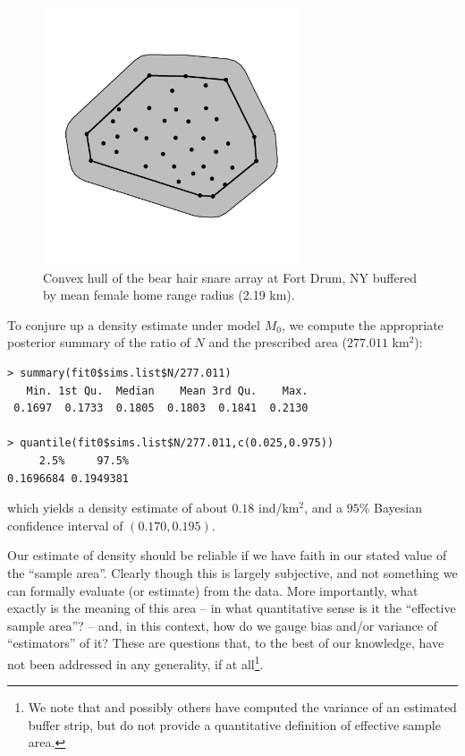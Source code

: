 \begin{figure}[ht]
\begin{center}
\includegraphics[height=3in,width=3in]{Ch3-Closed/figs/bufferedCH}
\end{center}
\caption{Convex hull of the bear hair snare array at Fort Drum, NY buffered by mean female
home range radius (2.19 km).}
\label{closed.fig.bch}
\end{figure}

To conjure up a
density estimate under model $M_0$, we compute the appropriate
posterior summary of the ratio of $N$ and the prescribed area ($277.011$ km$^2$):
{\small
\begin{verbatim}
> summary(fit0$sims.list$N/277.011)
   Min. 1st Qu.  Median    Mean 3rd Qu.    Max.
 0.1697  0.1733  0.1805  0.1803  0.1841  0.2130

> quantile(fit0$sims.list$N/277.011,c(0.025,0.975))
     2.5%     97.5%
0.1696684 0.1949381
\end{verbatim}
}
which yields a density estimate of about $0.18$ ind/km$^2$, and a $95\%$ Bayesian
confidence interval of $(0.170, 0.195)$.

Our estimate 
of density should be reliable  if we have faith in our
stated value of the ``sample area''. Clearly though this is largely
subjective, and not something we can formally evaluate (or estimate) from the data.
 More importantly, what exactly is
the meaning of this area -- in what quantitative sense is it the ``effective sample
area''? -- and, in this context, how do we gauge bias
and/or variance of ``estimators'' of it? These are questions that, to
the best of our knowledge, have not been addressed in any generality,
if at all\footnote{We note that \citet{karanth_nichols:1998} and
  possibly others have computed 
  the variance of an estimated buffer strip, but do not provide a
  quantitative definition of effective sample area.}. 

